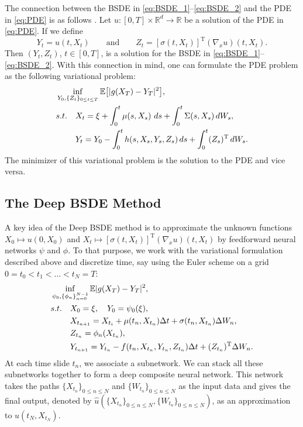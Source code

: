 \documentclass[12pt,AutoFakeBold,AutoFakeSlant]{article}
\theoremstyle{definition}
\newcommand{\R}{\mathbb{R}}
\newcommand{\E}{\mathbb{E}}
\newcommand{\transpose}{^{\operatorname{T}}}
\begin{document}
		The connection between the BSDE in \eqref{eq:BSDE_1}--\eqref{eq:BSDE_2} 
		and the PDE in \eqref{eq:PDE} is as follows \cite{Pardoux1992,Pardoux1999}.
		Let $ u \colon [0,T] \times \R^d \to \R $ be a solution of the PDE in \eqref{eq:PDE}. 
		If we define
		\begin{equation}
		\label{eq:nonlinear_Feynman_Kac}
		Y_t = u( t, X_t )
		\qquad  
		\text{and}
		\qquad 
		Z_t = [ \sigma( t, X_t ) ]^{ \operatorname{T} }  
		( \nabla_x u )( t, X_t ).
		\end{equation}
		Then $ ( Y_t, Z_t ) $, $ t \in [0,T] $, is a solution for the BSDE in \eqref{eq:BSDE_1}--\eqref{eq:BSDE_2}.
		With this connection in mind, one can formulate the PDE problem as 
		the following variational problem:
		\begin{align}
		&\inf_{Y_0,\{Z_t\}_{0\le t \le T}} \E\big[ |g(X_T) - Y_T|^2 \big], \\
		&s.t.\quad X_t = \xi + \int_{0}^{t}\mu(s,X_s)\, \,ds + \int_{0}^{t}\Sigma(s,X_s)\, dW_s, \\
		&\hphantom{s.t.}\quad Y_t = Y_0 - \int_{0}^{t}h(s,X_s,Y_s,Z_s)\,  ds + \int_{0}^{t}(Z_s)\transpose\, dW_s.
		\end{align}
		The  minimizer of this variational problem is the solution to the PDE and vice versa.

	\subsection{The Deep BSDE Method}

	A key idea of the Deep BSDE method 
	is to approximate the unknown functions
		$X_0 \mapsto u(0, X_0)$ {and}
		$X_t \mapsto [ \sigma(t,X_t) ]^{ \operatorname{T} } ( \nabla_x u )(t,X_t)$
		by feedforward neural networks $\psi$ and $\phi$.  To that purpose, we 
		work with the variational formulation described above and  discretize time, say using the Euler 
	scheme on a grid $0 = t_0 < t_1 < \ldots < t_N = T$:
		\begin{align}
		&\inf_{\psi_0, \{\phi_n\}_{n=0}^{N-1}} \E |g(X_T) - Y_T|^2, \\
		&s.t.\quad X_0 = \xi, \quad Y_0 = \psi_0(\xi), \\
		&\hphantom{s.t.}\quad X_{t_{n+1}} = X_{t_i} + \mu(t_n,X_{t_n})\Delta t + \sigma(t_n,X_{t_n})\Delta W_n, \\
		&\hphantom{s.t.}\quad Z_{t_n} = \phi_n(X_{t_n}), \\
		&\hphantom{s.t.}\quad Y_{t_{n+1}} = Y_{t_n} - f(t_n,X_{t_n},Y_{t_n},Z_{t_n})\Delta t + (Z_{t_n})\transpose\Delta W_n.
		\end{align}
	At each time slide $t_n$, we associate a subnetwork.
	We can stack all these subnetworks together to form a deep composite neural 
		network. This network takes the paths 
		$\{ X_{ t_n } \}_{ 0 \leq n \leq N }$ and 
		$\{ W_{ t_n } \}_{ 0 \leq n \leq N }$ 
		as the input data and gives the final output, denoted by
			$\hat{u}( 
			\{ { X_{ t_n } } \}_{ 0 \leq n \leq N } , 
			\{ W_{ t_n } \}_{ 0 \leq n \leq N } )$, 
		as an approximation to 
		$u( t_N, X_{ t_N } )$. 
		
\end{document}
